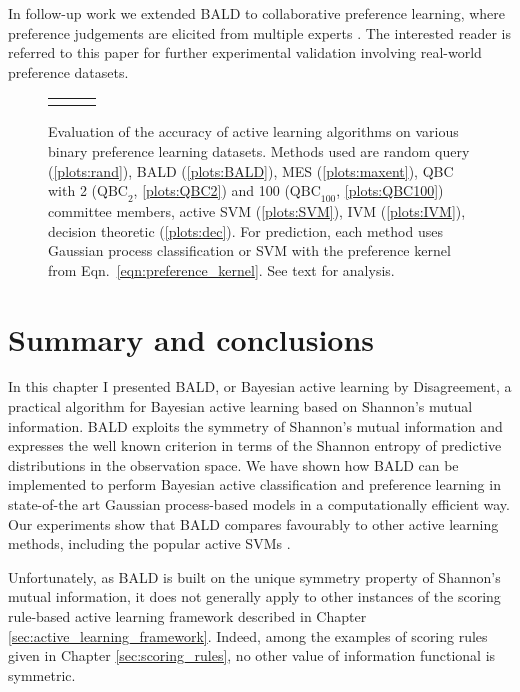 In follow-up work we extended BALD to collaborative preference learning, where preference judgements are elicited from multiple experts \citep{Houlsby2012preference}. The interested reader is referred to this paper for further experimental validation involving real-world preference datasets.
% 
\begin{figure}
	\begin{center}
	\begin{tabular}{ccc}
	&
	&
	
	\end{tabular}
	\end{center}
	\caption[Evaluation of Bayesian active learning of binary preference relations]{Evaluation of the accuracy of active learning algorithms on various binary preference learning datasets. Methods used are random query (\ref{plots:rand}), BALD (\ref{plots:BALD}),  MES (\ref{plots:maxent}), QBC with 2 ($\mbox{QBC}_2$, \ref{plots:QBC2}) and 100 ($\mbox{QBC}_{100}$, \ref{plots:QBC100}) committee members, active SVM (\ref{plots:SVM}), IVM (\ref{plots:IVM}), decision theoretic \citep{Kapoor2007} (\ref{plots:dec}). For prediction, each method uses Gaussian process classification or SVM with the preference kernel from Eqn.\ \eqref{eqn:preference_kernel}.  See text for analysis. \label{fig:BALD_pref_results}}
\end{figure}

\section{Summary and conclusions}

In this chapter I presented BALD, or Bayesian active learning by Disagreement, a practical algorithm for Bayesian active learning based on Shannon's mutual information. BALD exploits the symmetry of Shannon's mutual information and expresses the well known criterion in terms of the Shannon entropy of predictive distributions in the observation space. We have shown how BALD can be implemented to perform Bayesian active classification and preference learning in state-of-the art Gaussian process-based models in a computationally efficient way. Our experiments show that BALD compares favourably to other active learning methods, including the popular active SVMs \citep{Tong2002}.

Unfortunately, as BALD is built on the unique symmetry property of Shannon's mutual information, it does not generally apply to other instances of the scoring rule-based active learning framework described in Chapter \ref{sec:active_learning_framework}. Indeed, among the examples of scoring rules given in Chapter \ref{sec:scoring_rules}, no other value of information functional is symmetric.